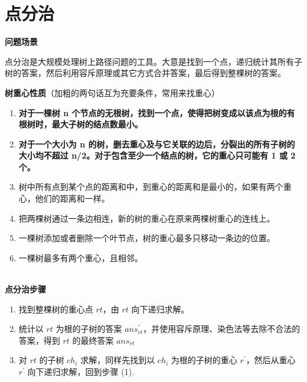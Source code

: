\section{点分治}
\textbf{问题场景}
~\\
\par \noindent 点分治是大规模处理树上路径问题的工具。大意是找到一个点，递归统计其所有子树的答案，然后利用容斥原理或其它方式合并答案，最后得到整棵树的答案。
~\\
\par \noindent \textbf{树重心性质}（加粗的两句话互为充要条件，常用来找重心）

\begin{enumerate}
\item \textbf{对于一棵树 n 个节点的无根树，找到一个点，使得把树变成以该点为根的有根树时，最大子树的结点数最小。}
\item \textbf{对于一个大小为 n 的树，删去重心及与它关联的边后，分裂出的所有子树的大小均不超过 n/2。对于包含至少一个结点的树，它的重心只可能有 1 或 2 个。}
\item 树中所有点到某个点的距离和中，到重心的距离和是最小的，如果有两个重心，他们的距离和一样。
\item 把两棵树通过一条边相连，新的树的重心在原来两棵树重心的连线上。
\item 一棵树添加或者删除一个叶节点，树的重心最多只移动一条边的位置。
\item 一棵树最多有两个重心，且相邻。
\end{enumerate}
~\\

\textbf{点分治步骤}
~\\
\begin{enumerate}
\item 找到整棵树的重心点 $rt$，由 $rt$ 向下递归求解。
\item 统计以 $rt$ 为根的子树的答案 $ans_{rt}^\prime$，并使用容斥原理、染色法等去除不合法的答案，得到 $rt$ 的最终答案 $ans_{rt}$
\item 对 $rt$ 的子树 $ch_i$ 求解，同样先找到以 $ch_i$ 为根的子树的重心 $r^\prime$，然后从重心 $r^\prime$ 向下递归求解，回到步骤 (1).
\end{enumerate}

